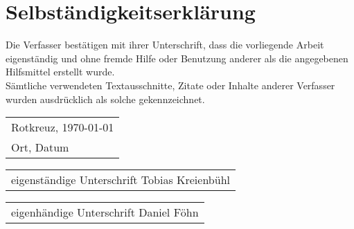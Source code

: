 \clearpage
\thispagestyle{empty}
\section*{Selbständigkeitserklärung}
Die Verfasser bestätigen mit ihrer Unterschrift, dass die vorliegende Arbeit eigenständig und ohne fremde Hilfe oder Benutzung anderer als die angegebenen Hilfsmittel erstellt wurde.\\Sämtliche verwendeten Textausschnitte, Zitate oder Inhalte anderer Verfasser wurden ausdrücklich als solche gekennzeichnet.

\vspace{2cm}
\begin{tabular}{@{}l@{}}
    Rotkreuz, \today\\
    Ort, Datum
\end{tabular}
\vspace{10cm}

\begin{tabular}{@{}l@{}}\hline
    eigenständige Unterschrift Tobias Kreienbühl
\end{tabular}
\vspace{2cm}

\begin{tabular}{@{}l@{}}\hline
    eigenhändige Unterschrift Daniel Föhn
\end{tabular}
\vspace{2cm}

\clearpage